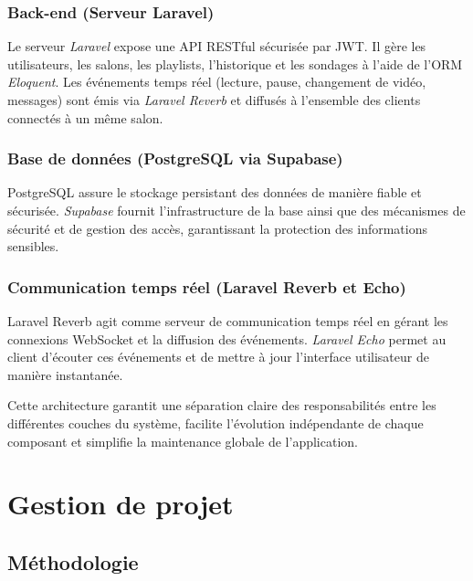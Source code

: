 \documentclass[12pt,a4paper]{report}
\begin{document}
\subsection{Back-end (Serveur Laravel)}
Le serveur \textit{Laravel} expose une API RESTful sécurisée par JWT. Il gère les utilisateurs, les salons, les playlists, l’historique et les sondages à l’aide de l’ORM \textit{Eloquent}. Les événements temps réel (lecture, pause, changement de vidéo, messages) sont émis via \textit{Laravel Reverb} et diffusés à l’ensemble des clients connectés à un même salon.

\subsection{Base de données (PostgreSQL via Supabase)}
PostgreSQL assure  le stockage persistant des données de manière fiable et sécurisée. \textit{Supabase} fournit l’infrastructure de la base ainsi que des mécanismes de sécurité et de gestion des accès, garantissant la protection des informations sensibles.

\subsection{Communication temps réel (Laravel Reverb et Echo)}
Laravel Reverb agit comme serveur de communication temps réel en gérant les connexions WebSocket et la diffusion des événements. \textit{Laravel Echo} permet au client d’écouter ces événements et de mettre à jour l’interface utilisateur de manière instantanée.

Cette architecture garantit une séparation claire des responsabilités entre les différentes couches du système, facilite l’évolution indépendante de chaque composant et simplifie la maintenance globale de l’application.










\chapter{Gestion de projet}

\section{Méthodologie}
\end{document}
